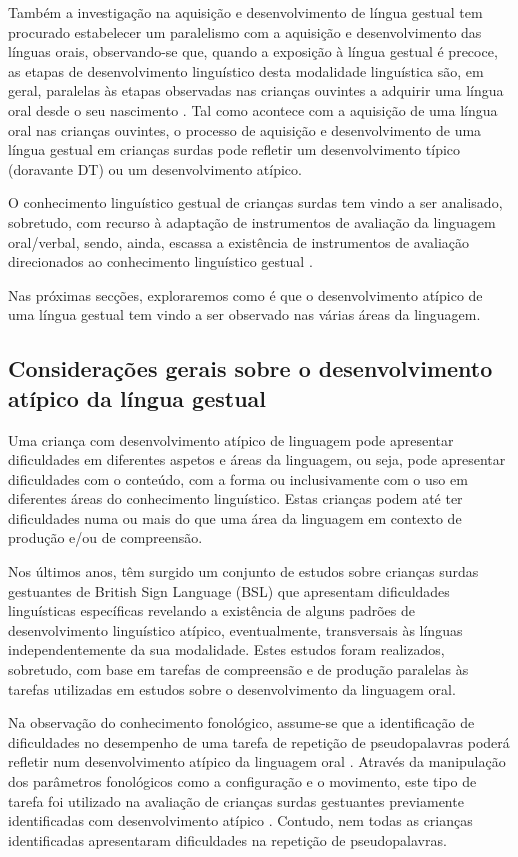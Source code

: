 \documentclass[output=paper,colorlinks,citecolor=brown,booklanguage=portuguese]{langscibook}
\begin{document}
Também a investigação na aquisição e desenvolvimento de língua gestual tem procurado estabelecer um paralelismo com a aquisição e desenvolvimento das línguas orais, observando-se que, quando a exposição à língua gestual é precoce, as etapas de desenvolvimento linguístico desta modalidade linguística são, em geral, paralelas às etapas observadas nas crianças ouvintes a adquirir uma língua oral desde o seu nascimento \citep{Newport1985, Schick2005}. Tal como acontece com a aquisição de uma língua oral nas crianças ouvintes, o processo de aquisição e desenvolvimento de uma língua gestual em crianças surdas pode refletir um desenvolvimento típico (doravante DT) ou um desenvolvimento atípico.

O conhecimento linguístico gestual de crianças surdas tem vindo a ser analisado, sobretudo, com recurso à adaptação de instrumentos de avaliação da linguagem oral/verbal, sendo, ainda, escassa a existência de instrumentos de avaliação direcionados ao conhecimento linguístico gestual \citep{Haug2020, Mann2015}.

Nas próximas secções, exploraremos como é que o desenvolvimento atípico de uma língua gestual tem vindo a ser observado nas várias áreas da linguagem.

\subsection{Considerações gerais sobre o desenvolvimento atípico da língua gestual}
Uma criança com desenvolvimento atípico de linguagem pode apresentar dificuldades em diferentes aspetos e áreas da linguagem, ou seja, pode apresentar dificuldades com o conteúdo, com a forma ou inclusivamente com o uso em diferentes áreas do conhecimento linguístico. Estas crianças podem até ter dificuldades numa ou mais do que uma área da linguagem em contexto de produção e/ou de compreensão.

Nos últimos anos, têm surgido um conjunto de estudos sobre crianças surdas gestuantes de British Sign Language (BSL) que apresentam dificuldades linguísticas específicas revelando a existência de alguns padrões de desenvolvimento linguístico atípico, eventualmente, transversais às línguas independentemente da sua modalidade. Estes estudos foram realizados, sobretudo, com base em tarefas de compreensão e de produção paralelas às tarefas utilizadas em estudos sobre o desenvolvimento da linguagem oral.

Na observação do conhecimento fonológico, assume-se que a identificação de dificuldades no desempenho de uma tarefa de repetição de pseudopalavras poderá refletir num desenvolvimento atípico da linguagem oral \citep{Archibald2007}. Através da manipulação dos parâmetros fonológicos como a configuração e o movimento, este tipo de tarefa foi utilizado na avaliação de crianças surdas gestuantes previamente identificadas com desenvolvimento atípico \citep{Mason2010, Morgan2007, Sehyr2018}. Contudo, nem todas as crianças identificadas apresentaram dificuldades na repetição de pseudopalavras.
\end{document}
